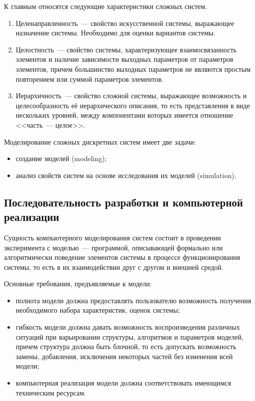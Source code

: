 К главным относятся следующие характеристики сложных систем.

\begin{enumerate}
    \item Целенаправленность~--- свойство искусственной системы, выражающее назначение системы. Необходимо для оценки вариантов системы.
    \item Целостность~--- свойство системы, характеризующее взаимосвязанность элементов и наличие зависимости выходных параметров от параметров элементов, причем большинство выходных параметров не являются простым повторением или суммой параметров элементов.
    \item Иерархичность~--- свойство сложной системы, выражающее возможность и целесообразность её иерархического описания, то есть представления в виде нескольких уровней, между компонентами которых имеется отношение <<часть~--- целое>>.
\end{enumerate}

Моделирование сложных дискретных систем имеет две задачи:

\begin{itemize}
    \item создание моделей (modeling);
    \item анализ свойств систем на основе исследования их моделей (simulation).
\end{itemize}

\subsection{Последовательность разработки и компьютерной реализации}

Сущность компьютерного моделирования систем состоит в проведении эксперимента с моделью~--- программой, описывающей формально или алгоритмически поведение элементов системы в процессе функционирования системы, то есть в их взаимодействии друг с другом и внешней средой.

Основные требования, предъявляемые к модели:

\begin{itemize}
    \item полнота модели должна предоставлять пользователю возможность получения необходимого набора характеристик, оценок системы;
    \item гибкость модели должна давать возможность воспроизведения различных ситуаций при варьировании структуры, алгоритмов и параметров моделей, причем структура должна быть блочной, то есть допускать возможность замены, добавления, исключения некоторых частей без изменения всей модели;
    \item компьютерная реализация модели должна соответствовать имеющимся техническим ресурсам.
\end{itemize}

